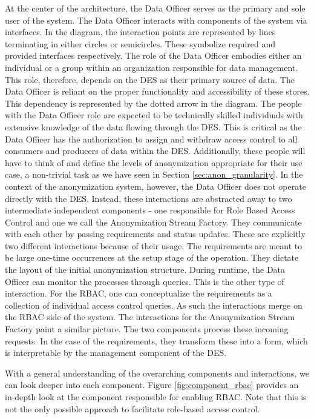 At the center of the architecture, the Data Officer serves as the primary and sole user of the system. The Data Officer interacts with components of the system via interfaces. In the diagram, the interaction points are represented by lines terminating in either circles or semicircles. These symbolize required and provided interfaces respectively. The role of the Data Officer embodies either an individual or a group within an organization responsible for data management. This role, therefore, depends on the \ac{DES} as their primary source of data. The Data Officer is reliant on the proper functionality and accessibility of these stores. This dependency is represented by the dotted arrow in the diagram. The people with the Data Officer role are expected to be technically skilled individuals with extensive knowledge of the data flowing through the \ac{DES}. This is critical as the Data Officer has the authorization to assign and withdraw access control to all consumers and producers of data within the \ac{DES}. Additionally, these people will have to think of and define the levels of anonymization appropriate for their use case, a non-trivial task as we have seen in Section \ref{sec:anon_granularity}. In the context of the anonymization system, however, the Data Officer does not operate directly with the \ac{DES}. Instead, these interactions are abstracted away to two intermediate independent components - one responsible for Role Based Access Control and one we call the Anonymization Stream Factory. They communicate with each other by passing requirements and status updates. These are explicitly two different interactions because of their usage. The requirements are meant to be large one-time occurrences at the setup stage of the operation. They dictate the layout of the initial anonymization structure. During runtime, the Data Officer can monitor the processes through queries. This is the other type of interaction. For the \ac{RBAC}, one can conceptualize the requirements as a collection of individual access control queries. As such the interactions merge on the \ac{RBAC} side of the system. The interactions for the Anonymization Stream Factory paint a similar picture. The two components process these incoming requests. In the case of the requirements, they transform these into a form, which is interpretable by the management component of the \ac{DES}. \par

With a general understanding of the overarching components and interactions, we can look deeper into each component. Figure \ref{fig:component_rbac} provides an in-depth look at the component responsible for enabling \ac{RBAC}. Note that this is not the only possible approach to facilitate role-based access control. 

